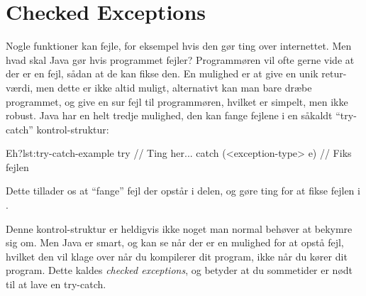 \section{Checked Exceptions}

	Nogle funktioner kan fejle, for eksempel hvis den gør ting over internettet.
	Men hvad skal Java gør hvis programmet fejler? Programmøren vil ofte gerne
	vide at der er en fejl, sådan at de kan fikse den. En mulighed er at give en
	unik retur-værdi, men dette er ikke altid muligt, alternativt kan man bare
	dræbe programmet, og give en sur fejl til programmøren, hvilket er simpelt,
	men ikke robust. Java har en helt tredje mulighed, den kan fange fejlene i
	en såkaldt ``try-catch'' kontrol-struktur:

	\begin{JavaCode}{Eh?}{lst:try-catch-example}
		try {
			// Ting her...
		} catch (<exception-type> e) {
			// Fiks fejlen
		}
	\end{JavaCode}

	Dette tillader os at ``fange'' fejl der opstår i 
	delen, og gøre ting for at fikse fejlen i .

	Denne kontrol-struktur er heldigvis ikke noget man normal behøver at bekymre
	sig om. Men Java er smart, og kan se når der er en mulighed for at opstå
	fejl, hvilket den vil klage over når du kompilerer dit program, ikke når du
	kører dit program. Dette kaldes \emph{checked exceptions}, og betyder at du
	sommetider er nødt til at lave en try-catch.



